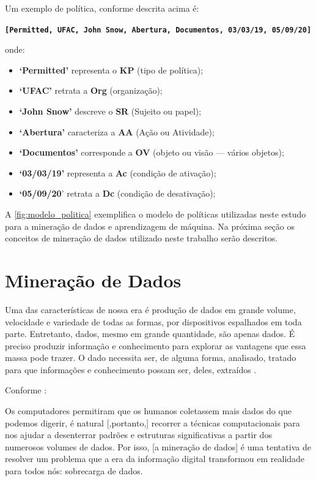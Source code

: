 Um exemplo de política, conforme descrita acima é:

\textbf{\texttt{[Permitted, UFAC, John Snow, Abertura, Documentos, 03/03/19, 05/09/20]}}

onde:
\begin{itemize}
	\item \textbf{`Permitted'} representa o \textbf{KP} (tipo de política); 
	\item \textbf{`UFAC'} retrata a \textbf{Org} (organização);
	\item \textbf{`John Snow'} descreve o \textbf{SR} (Sujeito ou papel);
	\item \textbf{`Abertura'} caracteriza a \textbf{AA} (Ação ou Atividade);
	\item \textbf{`Documentos'} corresponde a \textbf{OV} (objeto ou visão --- vários objetos);
	\item \textbf{`03/03/19'} representa a \textbf{Ac} (condição de ativação);
	\item \textbf{`05/09/20}' retrata a \textbf{Dc} (condição de desativação);
\end{itemize}

A \autoref{fig:modelo_politica} exemplifica o modelo de políticas utilizadas neste estudo para a mineração de dados e aprendizagem de máquina. Na próxima seção os conceitos de mineração de dados utilizado neste trabalho serão descritos.

\section{Mineração de Dados}\label{mineracao_dados}
Uma das características de nossa era é produção de dados em grande volume, velocidade e variedade de todas as formas, por dispositivos espalhados em toda parte. Entretanto, dados, mesmo em grande quantidade, são apenas dados. É preciso produzir informação e conhecimento para explorar as vantagens que essa massa pode trazer. O dado necessita ser, de alguma forma, analisado, tratado para que informações e conhecimento possam ser, deles, extraídos \cite{aprenda_mineracao_fernando_amaral16,ferrari2017}.

Conforme :
\begin{citacao}
	 Os computadores permitiram que os humanos coletassem mais dados do que podemos digerir, é natural [,portanto,] recorrer a técnicas computacionais para nos ajudar a desenterrar padrões e estruturas significativas a partir dos numerosos volumes de dados. Por isso, [a mineração de dados] é uma tentativa de resolver um problema que a era da informação digital transformou em realidade para todos nós: sobrecarga de dados.
\end{citacao}

